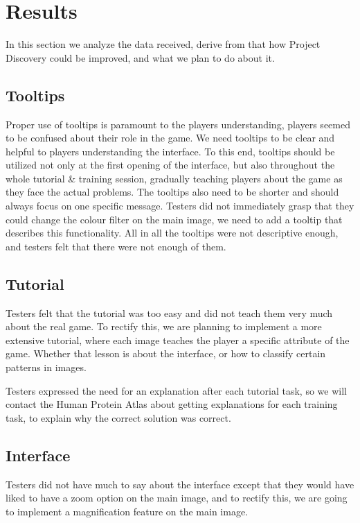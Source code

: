 \section{Results}\label{sec:results}
In this section we analyze the data received, derive from that how Project Discovery could be improved, and what we plan to do about it.

\subsection{Tooltips}
Proper use of tooltips is paramount to the players understanding, players seemed to be confused about their role in the game. We need tooltips to be clear and helpful to players understanding the interface. To this end, tooltips should be utilized not only at the first opening of the interface, but also throughout the whole tutorial \& training session, gradually teaching players about the game as they face the actual problems. The tooltips also need to be shorter and should always focus on one specific message. Testers did not immediately grasp that they could change the colour filter on the main image, we need to add a tooltip that describes this functionality. All in all the tooltips were not descriptive enough, and testers felt that there were not enough of them.

\subsection{Tutorial}
Testers felt that the tutorial was too easy and did not teach them very much about the real game. To rectify this, we are planning to implement a more extensive tutorial, where each image teaches the player a specific attribute of the game. Whether that lesson is about the interface, or how to classify certain patterns in images. 

Testers expressed the need for an explanation after each tutorial task, so we will contact the Human Protein Atlas about getting explanations for each training task, to explain why the correct solution was correct.

\subsection{Interface}
Testers did not have much to say about the interface except that they would have liked to have a zoom option on the main image, and to rectify this, we are going to implement a magnification feature on the main image.

